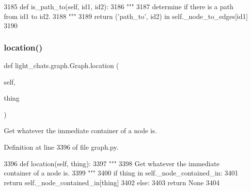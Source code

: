 \begin{DoxyCode}
3185     \textcolor{keyword}{def }is\_path\_to(self, id1, id2):
3186         \textcolor{stringliteral}{"""}
3187 \textcolor{stringliteral}{        determine if there is a path from id1 to id2.}
3188 \textcolor{stringliteral}{        """}
3189         \textcolor{keywordflow}{return} (\textcolor{stringliteral}{'path\_to'}, id2) \textcolor{keywordflow}{in} self.\_node\_to\_edges[id1]
3190 
\end{DoxyCode}
\mbox{\label{classlight__chats_1_1graph_1_1Graph_a33bf40491bd3aa15e65987377b3d580f}} 
\subsubsection{\texorpdfstring{location()}{location()}}
{\footnotesize\ttfamily def light\+\_\+chats.\+graph.\+Graph.\+location (\begin{DoxyParamCaption}\item[{}]{self,  }\item[{}]{thing }\end{DoxyParamCaption})}

\begin{DoxyVerb}Get whatever the immediate container of a node is.
\end{DoxyVerb}
 

Definition at line 3396 of file graph.\+py.


\begin{DoxyCode}
3396     \textcolor{keyword}{def }location(self, thing):
3397         \textcolor{stringliteral}{"""}
3398 \textcolor{stringliteral}{        Get whatever the immediate container of a node is.}
3399 \textcolor{stringliteral}{        """}
3400         \textcolor{keywordflow}{if} thing \textcolor{keywordflow}{in} self.\_node\_contained\_in:
3401             \textcolor{keywordflow}{return} self.\_node\_contained\_in[thing]
3402         \textcolor{keywordflow}{else}:
3403             \textcolor{keywordflow}{return} \textcolor{keywordtype}{None}
3404 
\end{DoxyCode}
\mbox{\label{classlight__chats_1_1graph_1_1Graph_a1e8203ba71f1edd33e989ba4a72d8533}} 
